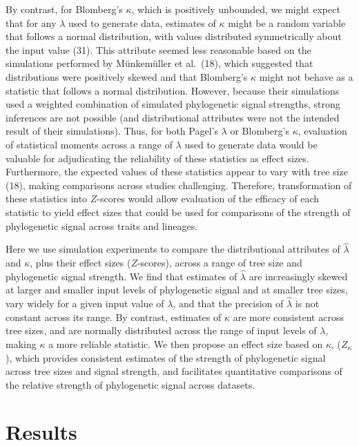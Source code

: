 \documentclass[9pt,twocolumn,twoside,lineno]{pnas-new}
\begin{document}
By contrast, for Blomberg's \(\kappa\), which is positively unbounded,
we might expect that for any \(\lambda\) used to generate data,
estimates of \(\kappa\) might be a random variable that follows a normal
distribution, with values distributed symmetrically about the input
value (31). This attribute seemed less reasonable based on the
simulations performed by Münkemüller et al.~(18), which suggested that
distributions were positively skewed and that Blomberg's \(\kappa\)
might not behave as a statistic that follows a normal distribution.
However, because their simulations used a weighted combination of
simulated phylogenetic signal strengths, strong inferences are not
possible (and distributional attributes were not the intended result of
their simulations). Thus, for both Pagel's \(\lambda\) or Blomberg's
\(\kappa\), evaluation of statistical moments across a range of
\(\lambda\) used to generate data would be valuable for adjudicating the
reliability of these statistics as effect sizes. Furthermore, the
expected values of these statistics appear to vary with tree size (18),
making comparisons across studies challenging. Therefore, transformation
of these statistics into \(Z\)-scores would allow evaluation of the
efficacy of each statistic to yield effect sizes that could be used for
comparisons of the strength of phylogenetic signal across traits and
lineages.

Here we use simulation experiments to compare the distributional
attributes of \(\hat{\lambda}\) and \(\kappa\), plus their effect sizes
(\(Z\)-scores), across a range of tree size and phylogenetic signal
strength. We find that estimates of \(\hat{\lambda}\) are increasingly
skewed at larger and smaller input levels of phylogenetic signal and at
smaller tree sizes, vary widely for a given input value of \(\lambda\),
and that the precision of \(\hat{\lambda}\) is not constant across its
range. By contrast, estimates of \(\kappa\) are more consistent across
tree sizes, and are normally distributed across the range of input
levels of \(\lambda\), making \(\kappa\) a more reliable statistic. We
then propose an effect size based on \(\kappa\), (\(Z_{\kappa}\)), which
provides consistent estimates of the strength of phylogenetic signal
across tree sizes and signal strength, and facilitates quantitative
comparisons of the relative strength of phylogenetic signal across
datasets.

\hypertarget{results}{%
\section{Results}\label{results}}
\end{document}

